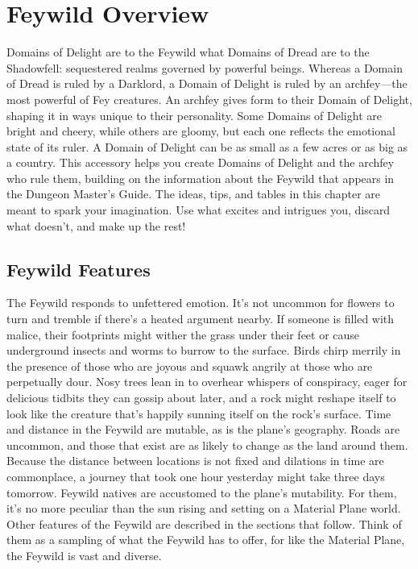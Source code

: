 \documentclass[10pt,a4paper,twoside,twocolumn,openany,nodeprecatedcode,bg=print]{dndbook}
\begin{document}
\tableofcontents
\newpage
\chapter{Feywild Overview}
Domains of Delight are to the Feywild what Domains of Dread are to the Shadowfell: sequestered realms governed by powerful beings. Whereas a Domain of Dread is ruled by a Darklord, a Domain of Delight is ruled by an archfey—the most powerful of Fey creatures. An archfey gives form to their Domain of Delight, shaping it in ways unique to their personality. Some Domains of Delight are bright and cheery, while others are gloomy, but each one reflects the emotional state of its ruler. A Domain of Delight can be as small as a few acres or as big as a country.
This accessory helps you create Domains of Delight and the archfey who rule them, building on the information about the Feywild that appears in the Dungeon Master's Guide. The ideas, tips, and tables in this chapter are meant to spark your imagination. Use what excites and intrigues you, discard what doesn't, and make up the rest!
\section{Feywild Features}
The Feywild responds to unfettered emotion. It's not uncommon for flowers to turn and tremble if there's a heated argument nearby. If someone is filled with malice, their footprints might wither the grass under their feet or cause underground insects and worms to burrow to the surface. Birds chirp merrily in the presence of those who are joyous and squawk angrily at those who are perpetually dour. Nosy trees lean in to overhear whispers of conspiracy, eager for delicious tidbits they can gossip about later, and a rock might reshape itself to look like the creature that's happily sunning itself on the rock's surface.
Time and distance in the Feywild are mutable, as is the plane's geography. Roads are uncommon, and those that exist are as likely to change as the land around them. Because the distance between locations is not fixed and dilations in time are commonplace, a journey that took one hour yesterday might take three days tomorrow. Feywild natives are accustomed to the plane's mutability. For them, it's no more peculiar than the sun rising and setting on a Material Plane world.
Other features of the Feywild are described in the sections that follow. Think of them as a sampling of what the Feywild has to offer, for like the Material Plane, the Feywild is vast and diverse.
\end{document}
